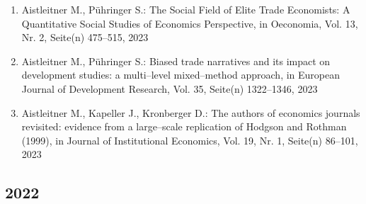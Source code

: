 \begin{enumerate}
	 \item Aistleitner M., Pühringer S.: The Social Field of Elite Trade Economists: A Quantitative Social Studies of Economics Perspective, in Oeconomia, Vol. 13, Nr. 2, Seite(n) 475--515, 2023
	 \item Aistleitner M., Pühringer S.: Biased trade narratives and its impact on development studies: a multi--level mixed--method approach, in European Journal of Development Research, Vol. 35, Seite(n) 1322--1346, 2023
	 \item Aistleitner M., Kapeller J., Kronberger D.: The authors of economics journals revisited: evidence from a large--scale replication of Hodgson and Rothman (1999), in Journal of Institutional Economics, Vol. 19, Nr. 1, Seite(n) 86–101, 2023
\end{enumerate}
\subsection*{2022}
